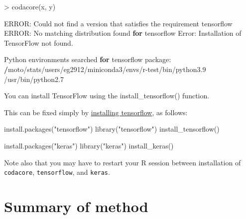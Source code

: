 \documentclass[
]{article}
\newenvironment{Shaded}{\begin{snugshade}}{\end{snugshade}}
\newcommand{\ControlFlowTok}[1]{\textcolor[rgb]{0.13,0.29,0.53}{\textbf{#1}}}
\newcommand{\ErrorTok}[1]{\textcolor[rgb]{0.64,0.00,0.00}{\textbf{#1}}}
\newcommand{\FloatTok}[1]{\textcolor[rgb]{0.00,0.00,0.81}{#1}}
\newcommand{\FunctionTok}[1]{\textcolor[rgb]{0.00,0.00,0.00}{#1}}
\newcommand{\NormalTok}[1]{#1}
\newcommand{\SpecialCharTok}[1]{\textcolor[rgb]{0.00,0.00,0.00}{#1}}
\newcommand{\StringTok}[1]{\textcolor[rgb]{0.31,0.60,0.02}{#1}}
\begin{document}
\begin{Shaded}
\begin{Highlighting}[]
\SpecialCharTok{\textgreater{}} \FunctionTok{codacore}\NormalTok{(x, y)}

\NormalTok{ERROR}\SpecialCharTok{:}\NormalTok{ Could not find a version that satisfies the requirement tensorflow}
\NormalTok{ERROR}\SpecialCharTok{:}\NormalTok{ No matching distribution found }\ControlFlowTok{for}\NormalTok{ tensorflow}
\NormalTok{Error}\SpecialCharTok{:}\NormalTok{ Installation of TensorFlow not found.}

\NormalTok{Python environments searched }\ControlFlowTok{for} \StringTok{\textquotesingle{}tensorflow\textquotesingle{}}\NormalTok{ package}\SpecialCharTok{:}
 \ErrorTok{/}\NormalTok{moto}\SpecialCharTok{/}\NormalTok{stats}\SpecialCharTok{/}\NormalTok{users}\SpecialCharTok{/}\NormalTok{eg2912}\SpecialCharTok{/}\NormalTok{miniconda3}\SpecialCharTok{/}\NormalTok{envs}\SpecialCharTok{/}\NormalTok{r}\SpecialCharTok{{-}}\NormalTok{test}\SpecialCharTok{/}\NormalTok{bin}\SpecialCharTok{/}\NormalTok{python3}\FloatTok{.9}
 \SpecialCharTok{/}\NormalTok{usr}\SpecialCharTok{/}\NormalTok{bin}\SpecialCharTok{/}\NormalTok{python2}\FloatTok{.7}

\NormalTok{You can install TensorFlow using the }\FunctionTok{install\_tensorflow}\NormalTok{() function.}
\end{Highlighting}
\end{Shaded}

This can be fixed simply by
\href{https://tensorflow.rstudio.com/installation/}{installing
tensorflow}, as follows:

\begin{Shaded}
\begin{Highlighting}[]
\FunctionTok{install.packages}\NormalTok{(}\StringTok{"tensorflow"}\NormalTok{)}
\FunctionTok{library}\NormalTok{(}\StringTok{"tensorflow"}\NormalTok{)}
\FunctionTok{install\_tensorflow}\NormalTok{()}

\FunctionTok{install.packages}\NormalTok{(}\StringTok{"keras"}\NormalTok{)}
\FunctionTok{library}\NormalTok{(}\StringTok{"keras"}\NormalTok{)}
\FunctionTok{install\_keras}\NormalTok{()}
\end{Highlighting}
\end{Shaded}

Note also that you may have to restart your R session between
installation of \texttt{codacore}, \texttt{tensorflow}, and
\texttt{keras}.

\hypertarget{summary-of-method}{%
\section{Summary of method}\label{summary-of-method}}
\end{document}
